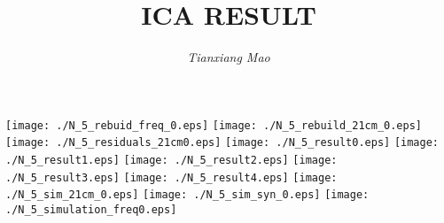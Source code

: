 \documentclass[12pt,a4paper]{report}
\title{ICA RESULT}
\author{\textit{Tianxiang Mao}}
\begin{document}
\maketitle
\begin{center}
\texttt{[image: ./N\_5\_rebuid\_freq\_0.eps]}
\texttt{[image: ./N\_5\_rebuild\_21cm\_0.eps]}
\texttt{[image: ./N\_5\_residuals\_21cm0.eps]}
\texttt{[image: ./N\_5\_result0.eps]}
\texttt{[image: ./N\_5\_result1.eps]}
\texttt{[image: ./N\_5\_result2.eps]}
\texttt{[image: ./N\_5\_result3.eps]}
\texttt{[image: ./N\_5\_result4.eps]}
\texttt{[image: ./N\_5\_sim\_21cm\_0.eps]}
\texttt{[image: ./N\_5\_sim\_syn\_0.eps]}
\texttt{[image: ./N\_5\_simulation\_freq0.eps]}
\end{center}
\end{document}
